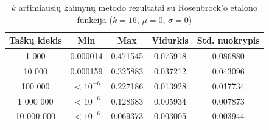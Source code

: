 \begin{table}[H]
    \centering
    \begin{tabular}{|c|c|c|c|c|}
        \hline
        \textbf{Taškų kiekis} & \textbf{Min} & \textbf{Max} & \textbf{Vidurkis} & \textbf{Std. nuokrypis} \\ \hline
        1 000        & 0.000014 & 0.471545 & 0.075918 & 0.086880 \\ \hline
        10 000       & 0.000159 & 0.325883 & 0.037212 & 0.043096 \\ \hline
        100 000      & $<10^{-6}$ & 0.227186 & 0.013928 & 0.017734 \\ \hline
        1 000 000    & $<10^{-6}$ & 0.128683 & 0.005934 & 0.007873 \\ \hline
        10 000 000   & $<10^{-6}$ & 0.069373 & 0.003005 & 0.003944 \\ \hline
    \end{tabular}
    \caption{$k$ artimiausių kaimynų metodo rezultatai su Rosenbrock'o etalono funkcija ($k = 16$, $\mu = 0$, $\sigma = 0$)}
\end{table}